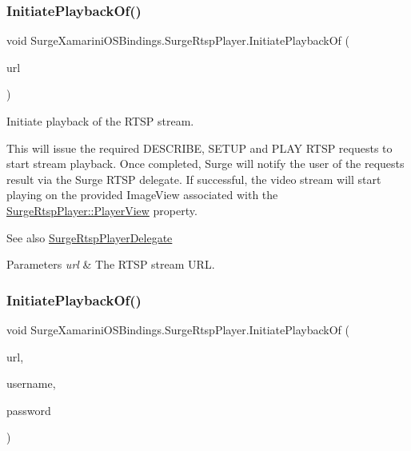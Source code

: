\subsubsection{\texorpdfstring{Initiate\+Playback\+Of()}{InitiatePlaybackOf()}\hspace{0.1cm}{\footnotesize\ttfamily [1/3]}}
{\footnotesize\ttfamily void Surge\+Xamarini\+O\+S\+Bindings.\+Surge\+Rtsp\+Player.\+Initiate\+Playback\+Of (\begin{DoxyParamCaption}\item[{N\+S\+Url}]{url }\end{DoxyParamCaption})}



Initiate playback of the R\+T\+SP stream. 

This will issue the required D\+E\+S\+C\+R\+I\+BE, S\+E\+T\+UP and P\+L\+AY R\+T\+SP requests to start stream playback. Once completed, Surge will notify the user of the requests result via the Surge R\+T\+SP delegate. If successful, the video stream will start playing on the provided Image\+View associated with the \hyperlink{interface_surge_xamarini_o_s_bindings_1_1_surge_rtsp_player_ab629f9303d6b427a8213e1dee03a3810}{Surge\+Rtsp\+Player\+::\+Player\+View} property.

\begin{DoxySeeAlso}{See also}
\hyperlink{interface_surge_xamarini_o_s_bindings_1_1_surge_rtsp_player_delegate}{Surge\+Rtsp\+Player\+Delegate} 
\end{DoxySeeAlso}



\begin{DoxyParams}{Parameters}
{\em url} & The R\+T\+SP stream U\+RL.\\
\hline
\end{DoxyParams}
\mbox{\label{interface_surge_xamarini_o_s_bindings_1_1_surge_rtsp_player_aed2fc640fe87633d54ba35a618b1240d}} 
\subsubsection{\texorpdfstring{Initiate\+Playback\+Of()}{InitiatePlaybackOf()}\hspace{0.1cm}{\footnotesize\ttfamily [2/3]}}
{\footnotesize\ttfamily void Surge\+Xamarini\+O\+S\+Bindings.\+Surge\+Rtsp\+Player.\+Initiate\+Playback\+Of (\begin{DoxyParamCaption}\item[{N\+S\+Url}]{url,  }\item[{N\+S\+String}]{username,  }\item[{N\+S\+String}]{password }\end{DoxyParamCaption})}



